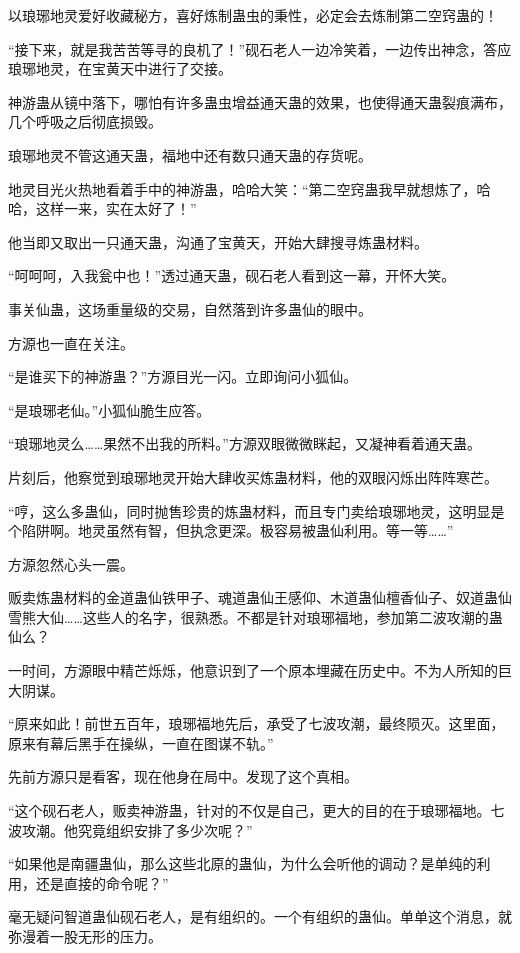 \begin{this_body}
以琅琊地灵爱好收藏秘方，喜好炼制蛊虫的秉性，必定会去炼制第二空窍蛊的！

“接下来，就是我苦苦等寻的良机了！”砚石老人一边冷笑着，一边传出神念，答应琅琊地灵，在宝黄天中进行了交接。

神游蛊从镜中落下，哪怕有许多蛊虫增益通天蛊的效果，也使得通天蛊裂痕满布，几个呼吸之后彻底损毁。

琅琊地灵不管这通天蛊，福地中还有数只通天蛊的存货呢。

地灵目光火热地看着手中的神游蛊，哈哈大笑：“第二空窍蛊我早就想炼了，哈哈，这样一来，实在太好了！”

他当即又取出一只通天蛊，沟通了宝黄天，开始大肆搜寻炼蛊材料。

“呵呵呵，入我瓮中也！”透过通天蛊，砚石老人看到这一幕，开怀大笑。

事关仙蛊，这场重量级的交易，自然落到许多蛊仙的眼中。

方源也一直在关注。

“是谁买下的神游蛊？”方源目光一闪。立即询问小狐仙。

“是琅琊老仙。”小狐仙脆生应答。

“琅琊地灵么……果然不出我的所料。”方源双眼微微眯起，又凝神看着通天蛊。

片刻后，他察觉到琅琊地灵开始大肆收买炼蛊材料，他的双眼闪烁出阵阵寒芒。

“哼，这么多蛊仙，同时抛售珍贵的炼蛊材料，而且专门卖给琅琊地灵，这明显是个陷阱啊。地灵虽然有智，但执念更深。极容易被蛊仙利用。等一等……”

方源忽然心头一震。

贩卖炼蛊材料的金道蛊仙铁甲子、魂道蛊仙王感仰、木道蛊仙檀香仙子、奴道蛊仙雪熊大仙……这些人的名字，很熟悉。不都是针对琅琊福地，参加第二波攻潮的蛊仙么？

一时间，方源眼中精芒烁烁，他意识到了一个原本埋藏在历史中。不为人所知的巨大阴谋。

“原来如此！前世五百年，琅琊福地先后，承受了七波攻潮，最终陨灭。这里面，原来有幕后黑手在操纵，一直在图谋不轨。”

先前方源只是看客，现在他身在局中。发现了这个真相。

“这个砚石老人，贩卖神游蛊，针对的不仅是自己，更大的目的在于琅琊福地。七波攻潮。他究竟组织安排了多少次呢？”

“如果他是南疆蛊仙，那么这些北原的蛊仙，为什么会听他的调动？是单纯的利用，还是直接的命令呢？”

毫无疑问智道蛊仙砚石老人，是有组织的。一个有组织的蛊仙。单单这个消息，就弥漫着一股无形的压力。


\end{this_body}
